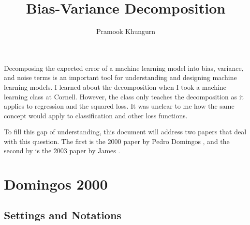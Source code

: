 \documentclass[10pt]{article}
\title{Bias-Variance Decomposition}
\author{Pramook Khungurn}
\begin{document}
  \maketitle

  Decomposing the expected error of a machine learning model into bias, variance, and noise terms is an important tool for understanding and designing machine learning models. I learned about the decomposition when I took a machine learning class at Cornell. However, the class only teaches the decomposition as it applies to regression and the squared loss. It was unclear to me how the same concept would apply to classification and other loss functions.

  To fill this gap of understanding, this document will address two papers that deal with this question. The first is the 2000 paper by Pedro Domingos \cite{Domingos:2000}, and the second by is the 2003 paper by James \cite{James:2003}.

  \section{Domingos 2000}

  \subsection{Settings and Notations}
\end{document}
